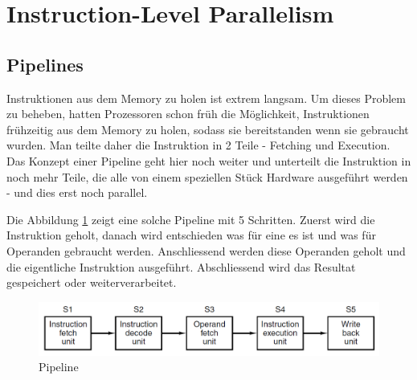 \section{Instruction-Level Parallelism}

\subsection{Pipelines}
Instruktionen aus dem Memory zu holen ist extrem langsam. Um dieses Problem zu beheben, hatten Prozessoren schon früh die Möglichkeit, Instruktionen frühzeitig aus dem Memory zu holen, sodass sie bereitstanden wenn sie gebraucht wurden.
Man teilte daher die Instruktion in 2 Teile - Fetching und Execution. Das Konzept einer Pipeline geht hier noch weiter und unterteilt die Instruktion in noch mehr Teile, die alle von einem speziellen Stück Hardware ausgeführt werden - und dies erst noch parallel.

Die Abbildung \ref{fig:pipeline} zeigt eine solche Pipeline mit 5 Schritten. Zuerst wird die Instruktion geholt, danach wird entschieden was für eine es ist und was für Operanden gebraucht werden. Anschliessend werden diese Operanden geholt und die eigentliche Instruktion ausgeführt. Abschliessend wird das Resultat gespeichert oder weiterverarbeitet.
\begin{figure}[h!]
	\centering
	\includegraphics[width=0.7\linewidth]{fig/pipeline}
	\caption{Pipeline}
	\label{fig:pipeline}
\end{figure}

